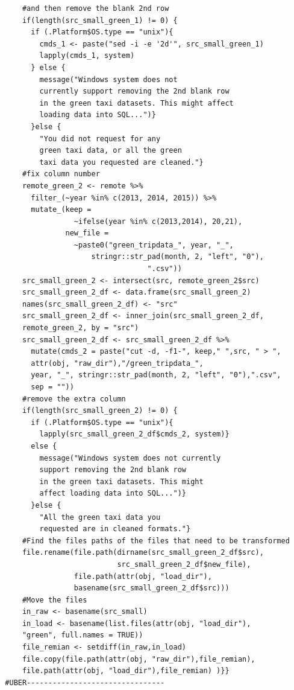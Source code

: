 \documentclass[12pt,twoside]{reedthesis}
\theoremstyle{definition}
\theoremstyle{definition}
\theoremstyle{definition}
\theoremstyle{remark}
\begin{document}
\begin{verbatim}
      #and then remove the blank 2nd row
      if(length(src_small_green_1) != 0) {
        if (.Platform$OS.type == "unix"){
          cmds_1 <- paste("sed -i -e '2d'", src_small_green_1)
          lapply(cmds_1, system)
        } else {
          message("Windows system does not 
          currently support removing the 2nd blank row
          in the green taxi datasets. This might affect 
          loading data into SQL...")}
        }else {
          "You did not request for any 
          green taxi data, or all the green
          taxi data you requested are cleaned."}
      #fix column number
      remote_green_2 <- remote %>%
        filter_(~year %in% c(2013, 2014, 2015)) %>%
        mutate_(keep = 
                  ~ifelse(year %in% c(2013,2014), 20,21),
                new_file = 
                  ~paste0("green_tripdata_", year, "_", 
                      stringr::str_pad(month, 2, "left", "0"),
                                   ".csv"))
      src_small_green_2 <- intersect(src, remote_green_2$src)
      src_small_green_2_df <- data.frame(src_small_green_2) 
      names(src_small_green_2_df) <- "src"
      src_small_green_2_df <- inner_join(src_small_green_2_df, 
      remote_green_2, by = "src")
      src_small_green_2_df <- src_small_green_2_df %>%
        mutate(cmds_2 = paste("cut -d, -f1-", keep," ",src, " > ",
        attr(obj, "raw_dir"),"/green_tripdata_", 
        year, "_", stringr::str_pad(month, 2, "left", "0"),".csv", 
        sep = ""))
      #remove the extra column
      if(length(src_small_green_2) != 0) {
        if (.Platform$OS.type == "unix"){
          lapply(src_small_green_2_df$cmds_2, system)} 
        else {
          message("Windows system does not currently 
          support removing the 2nd blank row 
          in the green taxi datasets. This might 
          affect loading data into SQL...")}
        }else {
          "All the green taxi data you
          requested are in cleaned formats."}
      #Find the files paths of the files that need to be transformed
      file.rename(file.path(dirname(src_small_green_2_df$src),
                            src_small_green_2_df$new_file), 
                  file.path(attr(obj, "load_dir"),
                  basename(src_small_green_2_df$src)))
      #Move the files
      in_raw <- basename(src_small)
      in_load <- basename(list.files(attr(obj, "load_dir"), 
      "green", full.names = TRUE))
      file_remian <- setdiff(in_raw,in_load)
      file.copy(file.path(attr(obj, "raw_dir"),file_remian), 
      file.path(attr(obj, "load_dir"),file_remian) )}}
  #UBER--------------------------------

\end{verbatim}
\end{document}
